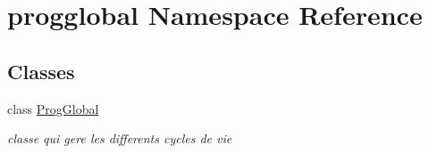 \hypertarget{namespaceprogglobal}{}\section{progglobal Namespace Reference}
\label{namespaceprogglobal}
\subsection*{Classes}
\begin{DoxyCompactItemize}
\item 
class \hyperlink{classprogglobal_1_1_prog_global}{Prog\+Global}
\begin{DoxyCompactList}\small\item\em classe qui gere les differents cycles de vie \end{DoxyCompactList}\end{DoxyCompactItemize}
